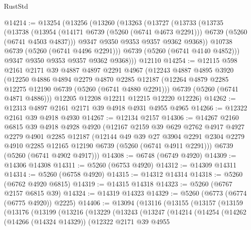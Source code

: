 \begin{lexlean}{RustStd}
\begin{coremodule}
@14214 := @13254
    (@13256
      (@13260
        (@13263
          (@13727
            (@13733
              (@13735
                (@13738
                  (@13954
                    (@14171 @6739 (@5260 (@6741 @4673 @2291)))
                    @6739
                    (@5260 (@6741 @4503 @4837)))
                  @9347
                  @9350
                  @9353
                  @9357
                  @9362
                  @9368))
              @10738
              @6739
              (@5260 (@6741 @4496 @2291)))
            @6739
            (@5260 (@6741 @4140 @4852)))
          @9347
          @9350
          @9353
          @9357
          @9362
          @9368)))
    @12110
@14254 := @12115
    @598
    @2161
    @2171
    @39
    @4887
    @4897
    @2291
    @4967
    (@12243
      @4887
      @4895
      @3920
      (@12250
        @4886
        @4894
        @2279
        @4870
        @2285
        @12187
        (@12264 @4879 @2285 @12275 @12190 @6739 (@5260 (@6741 @4880 @2291)))
        @6739
        (@5260 (@6741 @4871 @4886)))
      @12205
      @12208
      @12211
      @12215
      @12220
      @12226)
@14262 := @12313 @4897 @2161 @2171 @39 @4918 @4931 @4955 @4965
@14266 := @12322 @2161 @39 @4918 @4930
@14267 := @12134 @2157
@14306 := @14267
    @2160
    @6815
    @39
    @4918
    @4928
    @4920
    (@12167
      @2159
      @39
      @629
      @2762
      @4917
      @4927
      @2279
      @4901
      @2285
      @12187
      (@12144
        @49
        @39
        @27
        @3904
        @2291
        @2304
        @2279
        @4910
        @2285
        @12165
        @12190
        @6739
        (@5260 (@6741 @4911 @2291)))
      @6739
      (@5260 (@6741 @4902 @4917)))
@14308 := @6748 (@6749 @4920)
@14309 := @14306 @14308
@14311 := @5260 (@6753 @4920)
@14312 := @14309 @14311
@14314 := @5260 (@6758 @4920)
@14315 := @14312 @14314
@14318 := @5260 (@6762 @4920 @6815)
@14319 := @14315 @14318
@14323 := @5260 (@6767 @2157 @6815 @39)
@14324 := @14319 @14323
@14329 := @5260 (@6773 (@6774 (@6775 @4920)) @2225)
@14406 := @13094
    (@13116
      (@13155
        (@13157
          (@13159
            (@13176
              (@13199
                (@13216
                  (@13229
                    (@13243
                      (@13247
                        (@14214
                          (@14254
                            (@14262
                              (@14266 (@14324 @14329))
                              (@12322
                                @2171
                                @39
                                @4955

\end{coremodule}
\end{lexlean}
